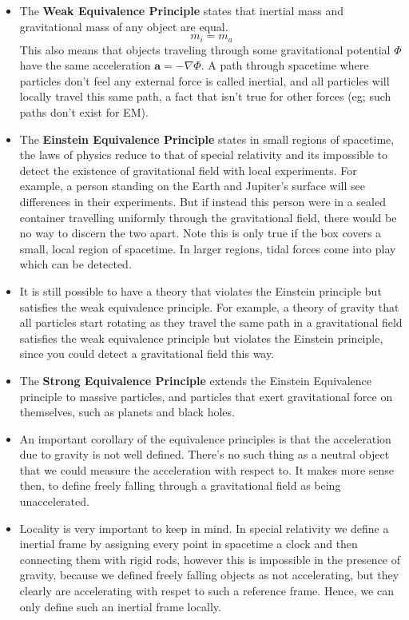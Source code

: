 \documentclass[11pt]{article}
\begin{document}
\begin{itemize}
    \item The \textbf{Weak Equivalence Principle} states that inertial mass and gravitational mass of any object are equal.
    \[
        m_i = m_a
    \]
    This also means that objects traveling through some gravitational potential \(\Phi\) have the same acceleration \(\mathbf{a} = - \nabla \Phi\). A path through spacetime where particles don't feel any external force
    is called inertial, and all particles will locally travel this same path, a fact that isn't true for other forces (eg; such paths don't exist for EM). 
    
    \item The \textbf{Einstein Equivalence Principle} states in small regions of spacetime, the laws of physics reduce to that of special relativity and its impossible to detect the existence of gravitational field with local experiments.
    For example, a person standing on the Earth and Jupiter's surface will see differences in their experiments. But if instead this person were in a sealed container travelling uniformly through the gravitational field, there would be no way
    to discern the two apart. Note this is only true if the box covers a small, local region of spacetime. In larger regions, tidal forces come into play which can be detected.

    \item It is still possible to have a theory that violates the Einstein principle but satisfies the weak equivalence principle. For example, a theory of gravity that all particles start rotating as they travel the same path in a gravitational 
    field satisfies the weak equivalence principle but violates the Einstein principle, since you could detect a gravitational field this way.

    \item The \textbf{Strong Equivalence Principle} extends the Einstein Equivalence principle to massive particles, and particles that exert gravitational force on themselves, such as planets and black holes. 
     
    \item An important corollary of the equivalence principles is that the acceleration due to gravity is not well defined. There's no such thing as a neutral object that we could measure the acceleration with respect to. It makes more sense then, to 
    define freely falling through a gravitational field as being unaccelerated.

    \item Locality is very important to keep in mind. In special relativity we define a inertial frame by assigning every point in spacetime a clock and then connecting them with rigid rods, however this is impossible in the presence of gravity,
    because we defined freely falling objects as not accelerating, but they clearly are accelerating with respet to such a reference frame. Hence, we can only define such an inertial frame locally.   

    
\end{itemize}
\end{document}
